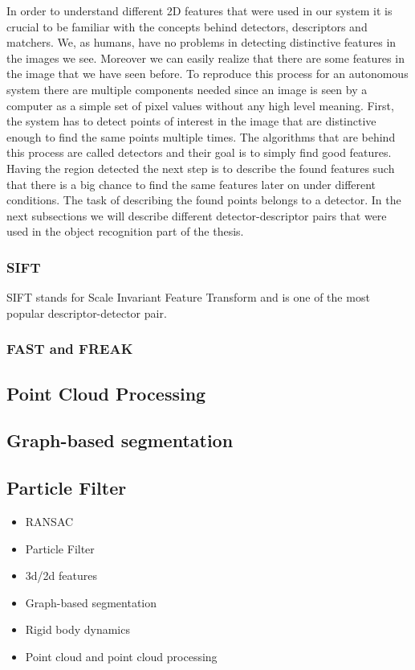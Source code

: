 In order to understand different 2D features that were used in our system it is crucial to be familiar with the concepts behind detectors, descriptors and matchers. We, as humans, have no problems in detecting distinctive features in the images we see. Moreover we can easily realize that there are some features in the image that we have seen before. To reproduce this process for an autonomous system there are multiple components needed since an image is seen by a computer as a simple set of pixel values without any high level meaning. First, the system has to detect points of interest in the image that are distinctive enough to find the same points multiple times. The algorithms that are behind this process are called detectors and their goal is to simply find good features. Having the region detected the next step is to describe the found features such that there is a big chance to find the same features later on under different conditions. The task of describing the found points belongs to a detector. In the next subsections we will describe different detector-descriptor pairs that were used in the object recognition part of the thesis.

\subsubsection{SIFT}
SIFT stands for Scale Invariant Feature Transform and is one of the most popular descriptor-detector pair.    



\subsubsection{FAST and FREAK}


\subsection{Point Cloud Processing}
\subsection{Graph-based segmentation}
\subsection{Particle Filter}

\begin{itemize}
\item RANSAC
\item Particle Filter
\item 3d/2d features
\item Graph-based segmentation
\item Rigid body dynamics
\item Point cloud and point cloud processing
\end{itemize}


